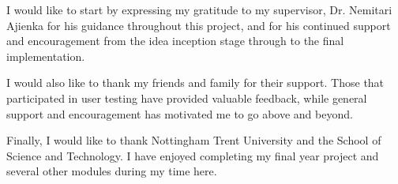 I would like to start by expressing my gratitude to my supervisor, Dr. Nemitari Ajienka for his guidance throughout this project, 
and for his continued support and encouragement from the idea inception stage through to the final implementation.

I would also like to thank my friends and family for their support.
Those that participated in user testing have provided valuable feedback,
while general support and encouragement has motivated me to go above and beyond.

Finally, I would like to thank Nottingham Trent University and the School of Science and Technology.
I have enjoyed completing my final year project and several other modules during my time here.

